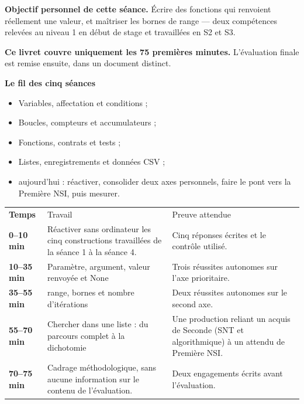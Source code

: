 \documentclass[10pt,a4paper]{article}
\begin{document}
\begin{goalbox}
\textbf{Objectif personnel de cette séance.} Écrire des fonctions qui renvoient réellement une valeur, et maîtriser les bornes de range — deux compétences relevées au niveau 1 en début de stage et travaillées en S2 et S3.
\par\medskip
\textbf{Ce livret couvre uniquement les 75 premières minutes.} L'évaluation finale est remise ensuite, dans un document distinct.
\end{goalbox}
\begin{methodbox}
\textbf{Le fil des cinq séances}
\begin{itemize}[leftmargin=13mm,labelsep=3mm,itemsep=1.5pt]
\item[\textbf{\color{Navy}S1}] Variables, affectation et conditions ;
\item[\textbf{\color{Navy}S2}] Boucles, compteurs et accumulateurs ;
\item[\textbf{\color{Navy}S3}] Fonctions, contrats et tests ;
\item[\textbf{\color{Navy}S4}] Listes, enregistrements et données CSV ;
\item[\textbf{\color{Navy}S5}] aujourd'hui : réactiver, consolider deux axes personnels, faire le pont vers la Première NSI, puis mesurer.
\end{itemize}
\end{methodbox}
\par\noindent\begin{tabularx}{\linewidth}{>{\bfseries}p{20mm} X X}
\rowcolor{Navy}\color{white}Temps & \color{white}Travail & \color{white}Preuve attendue \\
0--10 min & Réactiver sans ordinateur les cinq constructions travaillées de la séance 1 à la séance 4. & Cinq réponses écrites et le contrôle utilisé. \\
10--35 min & Paramètre, argument, valeur renvoyée et None & Trois réussites autonomes sur l'axe prioritaire. \\
35--55 min & range, bornes et nombre d'itérations & Deux réussites autonomes sur le second axe. \\
55--70 min & Chercher dans une liste : du parcours complet à la dichotomie & Une production reliant un acquis de Seconde (SNT et algorithmique) à un attendu de Première NSI. \\
70--75 min & Cadrage méthodologique, sans aucune information sur le contenu de l'évaluation. & Deux engagements écrits avant l'évaluation. \\
\end{tabularx}
\end{document}
